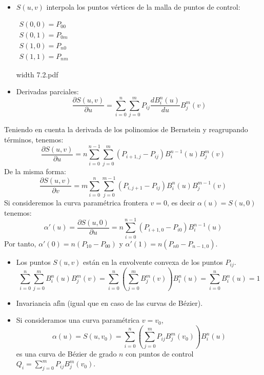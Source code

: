 \documentclass[twoside]{report}
\newcommand{\colocapdf}[2]{\quad\pdfimage width #2 {#1.pdf}}
\begin{document}
\begin{itemize}
\item $S(u,v)$ interpola los puntos v\'{e}rtices de la malla de puntos de control:

\begin{center}


\end{center}
\begin{minipage}{.3\textwidth}
$\begin{array}{c} S(0,0)=P_{00}\\ S(0,1)=P_{0m}\\
S(1,0)=P_{n0}\\ S(1,1)=P_{nm}
\end{array}$
\end{minipage} \quad
\begin{minipage}{.3\textwidth}\colocapdf{7.2}{\textwidth}
\end{minipage}

\item Derivadas parciales:
$$\frac{\partial S(u,v)}{\partial u}=\sum_{i=0}^n \sum_{j=0}^m P_{ij} \frac{dB_i^n(u)}{d u} B_j^m(v)$$
\end{itemize}

Teniendo en cuenta la derivada de los polinomios de Bernstein y reagrupando t\'{e}rminos, tenemos:
$$\frac{\partial S(u,v)}{\partial u}=n\sum_{i=0}^{n-1} \sum_{j=0}^m (P_{i+1,j}-P_{ij}) B_i^{n-1}(u) B_j^m(v)$$
De la misma forma:
$$\frac{\partial S(u,v)}{\partial v}=m\sum_{i=0}^{n} \sum_{j=0}^{m-1} (P_{i,j+1}-P_{ij}) B_i^{n}(u) B_j^{m-1}(v)$$
Si consideremos la curva param\'{e}trica frontera $v=0$, es decir $\alpha(u)=S(u,0)$ tenemos:
$$\alpha'(u)=\frac{\partial S(u,0)}{\partial u}=n\sum_{i=0}^{n-1} (P_{i+1,0}-P_{i0}) B_i^{n-1}(u)$$
Por tanto, $\alpha'(0)=n(P_{10}-P_{00})$ y $\alpha'(1)=n(P_{n0}-P_{n-1,0}).$

\begin{itemize}
\item Los puntos $S(u,v)$ est\'{a}n en la envolvente convexa de los puntos $P_{ij}$.
$$\sum_{i=0}^{n} \sum_{j=0}^m B_i^{n}(u) B_j^m(v)= \sum_{i=0}^{n}\left( \sum_{j=0}^m B_j^m(v) \right) B_i^{n}(u)=\sum_{i=0}^{n} B_i^{n}(u)=1$$
\item Invariancia af\'{\i}n (igual que en caso de las curvas de B\'{e}zier).
\item Si consideramos una curva param\'{e}trica $v=v_0$,
$$\alpha(u)=S(u,v_0)=\sum_{i=0}^n \left( \sum_{j=0}^m P_{ij} B_j^m(v_0) \right) B_i^n(u)$$
es una curva de B\'{e}zier de grado $n$ con puntos de control $Q_i=\sum_{j=0}^m P_{ij} B_j^m(v_0).$
\end{itemize}
\end{document}
